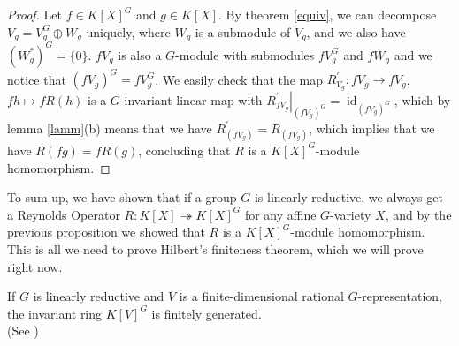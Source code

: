 \begin{proof}
  Let $f \in K[X]^G$ and $g \in K[X]$.
  By theorem \ref{equiv}, we can decompose \linebreak$V_g = V_g^G \oplus W_g$ uniquely, where $W_g$ is a submodule of $V_g$, and we also have $(W_g^\ast)^G = \{0\}$.  %
  $fV_g$ is also a $G$-module with submodules $fV_g^G$ and $fW_g$ and we notice that $(fV_g)^G = fV_g^G$.
  We easily check that the map $R_{V_g}^\prime \colon fV_g \rightarrow fV_g$, $fh \mapsto f R(h)$ is a $G$-invariant linear map with $\left. R_{fV_g}^\prime \right|_{(fV_g)^G} = \operatorname{id}_{(fV_g)^G}$, which by lemma \ref{lamm}(b) means that we have $R_{(fV_g)}^\prime = R_{(fV_g)}$, which implies that we have $R(fg) = fR(g)$, concluding that $R$ is a $K[X]^G$-module homomorphism.
\end{proof}


To sum up, we have shown that if a group $G$ is linearly reductive, we always get a Reynolds Operator $R \colon K[X] \twoheadrightarrow K[X]^G$ for any affine $G$-variety $X$, and by the previous proposition we showed that $R$ is a $K[X]^G$-module homomorphism.
This is all we need to prove Hilbert's finiteness theorem, which we will prove right now.

\begin{theorem}\label{hilbert}
  If $G$ is linearly reductive and $V$ is a finite-dimensional rational $G$-representation, the invariant ring $K[V]^G$ is finitely generated.  \\
  (See \cite[2.2.10]{DK15})
\end{theorem}

